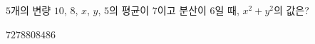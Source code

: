 $5$개의 변량 $10$, $8$, $x$, $y$, $5$의 평균이 $7$이고 분산이 $6$일 때, $x^2+y^2$의 값은?
\begin{choices32}{$72$}{$78$}{$80$}{$84$}{$86$}\end{choices32}

